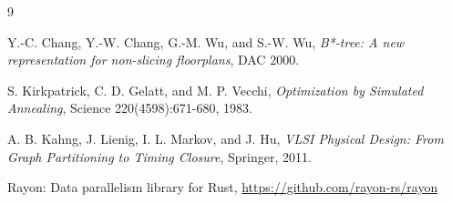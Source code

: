 \documentclass[11pt]{article}
\begin{document}
\begin{thebibliography}{9}

Y.-C. Chang, Y.-W. Chang, G.-M. Wu, and S.-W. Wu,
\textit{B*-tree: A new representation for non-slicing floorplans},
DAC 2000.

S. Kirkpatrick, C. D. Gelatt, and M. P. Vecchi,
\textit{Optimization by Simulated Annealing},
Science 220(4598):671-680, 1983.

A. B. Kahng, J. Lienig, I. L. Markov, and J. Hu,
\textit{VLSI Physical Design: From Graph Partitioning to Timing Closure},
Springer, 2011.

Rayon: Data parallelism library for Rust,
\url{https://github.com/rayon-rs/rayon}

\end{thebibliography}
\end{document}

